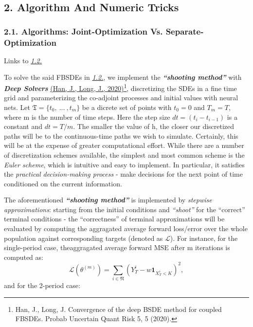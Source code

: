 \documentclass[
]{article}
\begin{document}
\hypertarget{algorithm-and-numeric-tricks}{%
\subsection{2. Algorithm And Numeric
Tricks}\label{algorithm-and-numeric-tricks}}

\hypertarget{algorithms-joint-optimization-vs.-separate-optimization}{%
\subsubsection{2.1. Algorithms: Joint-Optimization Vs.
Separate-Optimization}\label{algorithms-joint-optimization-vs.-separate-optimization}}

Links to
\protect\hyperlink{12-rec-market-modeling-with-fbsdes}{\emph{1.2.}}

To solve the said FBSDEs in
\protect\hyperlink{12-rec-market-modeling-with-fbsdes}{\emph{1.2.}}, we
implement the \textbf{\emph{``shooting method''}} with
\emph{\textbf{Deep Solvers}}
\href{https://doi.org/10.1186/s41546-020-00047-w}{(Han, J., Long, J.,
2020)}\footnote{Han, J., Long, J. Convergence of the deep BSDE method
  for coupled FBSDEs. Probab Uncertain Quant Risk 5, 5 (2020).},
discretizing the SDEs in a fine time grid and parameterizing the
co-adjoint processes and initial values with neural nets. Let
\(\mathfrak{T}=\lbrace{t_0,~...~, t_m \rbrace}\) be a dicrete set of
points with \(t_0=0\) and \(T_m=T\), where m is the number of time
steps. Here the step size \(dt=(t_i-t_{i-1})\) is a constant and
\(dt=T/m\). The smaller the value of h, the closer our discretized paths
will be to the continuous-time paths we wish to simulate. Certainly,
this will be at the expense of greater computational effort. While there
are a number of discretization schemes available, the simplest and most
common scheme is the \emph{Euler scheme}, which is intuitive and easy to
implement. In particular, it satisfies the \emph{practical
decision-making process} - make decisions for the next point of time
conditioned on the current information.

The aforementioned \textbf{\emph{``shooting method''}} is implemented by
\emph{stepwise approximations}: starting from the initial conditions and
\emph{``shoot''} for the ``correct'' terminal conditions - the
``correctness'' of terminal approximations will be evaluated by
computing the aggragated average forward loss/error over the whole
population against corresponding targets (denoted as \(\mathcal{L}\)).
For instance, for the single-period case, theaggragated average forward
MSE after m iterations is computed as: \[
\mathcal{L}(\theta^{(m)})= \sum_{i\in\mathfrak{N}}(Y_{T}^i-w\mathbf{1}_{X_{T}^i<K})^2,
\] and for the 2-period case:
\end{document}
